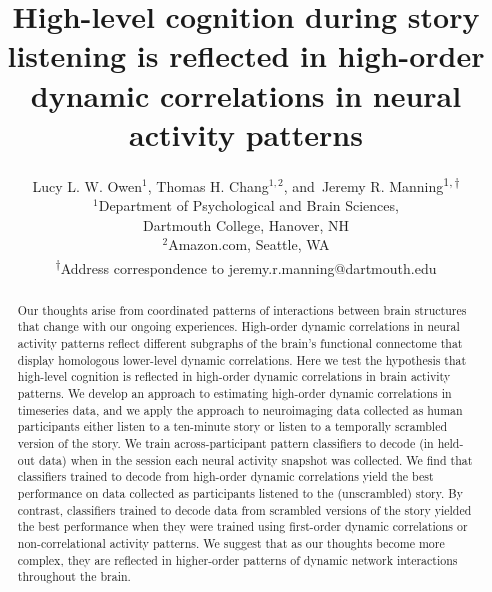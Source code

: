 \documentclass[english]{article}
\title{High-level cognition during story listening is reflected in
  high-order dynamic correlations in neural activity patterns}
\author{Lucy L. W. Owen$^1$, Thomas H. Chang$^{1,2}$, and\
  Jeremy R. Manning\textsuperscript{$1, \dagger$}\\
  [0.1in]$^1$Department of Psychological and Brain
  Sciences,\\Dartmouth
  College, Hanover, NH\\
  $^2$Amazon.com, Seattle, WA\\
  \textsuperscript{$\dagger$}Address correspondence to
  jeremy.r.manning@dartmouth.edu}
\begin{document}
\maketitle


\begin{abstract}
  Our thoughts arise from coordinated patterns of interactions between
  brain structures that change with our ongoing experiences.
  High-order dynamic correlations in neural activity patterns reflect
  different subgraphs of the brain's functional connectome that display
  homologous lower-level dynamic correlations.  Here we test the
  hypothesis that high-level cognition is reflected in high-order
  dynamic correlations in brain activity patterns.  We develop an
  approach to estimating high-order dynamic correlations in timeseries
  data, and we apply the approach to neuroimaging data collected as
  human participants either listen to a ten-minute story or listen
  to a temporally scrambled version of the story.  We train
  across-participant pattern classifiers to decode (in held-out data)
  when in the session each neural activity snapshot was collected.  We
  find that classifiers trained to decode from high-order dynamic
  correlations yield the best performance on data collected as
  participants listened to the (unscrambled) story.  By contrast,
  classifiers trained to decode data from scrambled versions of the
  story yielded the best performance when they were trained using
  first-order dynamic correlations or non-correlational activity
  patterns.  We suggest that as our thoughts become more complex, they
  are reflected in higher-order patterns of dynamic network
  interactions throughout the brain.
\end{abstract}

\doublespacing
\end{document}
